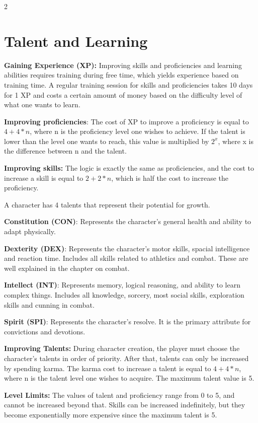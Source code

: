 \begin{multicols}{2}
\section{Talent and Learning}

\textbf{Gaining Experience (XP):} Improving skills and proficiencies and learning abilities requires training during free time, which yields experience based on training time. A regular training session for skills and proficiencies takes 10 days for 1 XP and costs a certain amount of money based on the difficulty level of what one wants to learn.

\textbf{Improving proficiencies}: The cost of XP to improve a proficiency is equal to $4+4*n$, where n is the proficiency level one wishes to achieve. If the talent is lower than the level one wants to reach, this value is multiplied by $2^x$, where x is the difference between n and the talent. 

\textbf{Improving skills:} The logic is exactly the same as proficiencies, and the cost to increase a skill is equal to $2+2*n$, which is half the cost to increase the proficiency.

A character has 4 talents that represent their potential for growth.

\textbf{Constitution (CON)}: Represents the character's general health and ability to adapt physically.

\textbf{Dexterity (DEX)}: Represents the character's motor skills, spacial intelligence and reaction time. Includes all skills related to athletics and combat. These are well explained in the chapter on combat.

\textbf{Intellect (INT)}: Represents memory, logical reasoning, and ability to learn complex things. Includes all knowledge, sorcery, most social skills, exploration skills and cunning in combat. 

\textbf{Spirit (SPI)}: Represents the character's resolve. It is the primary attribute for convictions and devotions.

\textbf{Improving Talents:} During character creation, the player must choose the character's talents in order of priority. After that, talents can only be increased by spending karma. The karma cost to increase a talent is equal to $4+4*n$, where n is the talent level one wishes to acquire. The maximum talent value is 5.

\textbf{Level Limits:} The values of talent and proficiency range from 0 to 5, and cannot be increased beyond that. Skills can be increased indefinitely, but they become exponentially more expensive since the maximum talent is 5.


\end{multicols}
